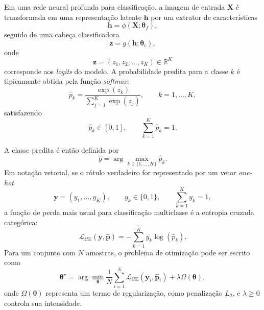 \documentclass[tcc,capa]{texufpel}
\begin{document}
Em uma rede neural profunda para classificação, a imagem de entrada $\mathbf{X}$ é transformada em uma representação latente $\mathbf{h}$ por um extrator de características
\begin{equation}
\mathbf{h} = \phi(\mathbf{X}; \boldsymbol{\theta}_{f}),
\end{equation}
seguido de uma cabeça classificadora
\begin{equation}
\mathbf{z} = g(\mathbf{h}; \boldsymbol{\theta}_{c}),
\end{equation}
onde
\begin{equation}
\mathbf{z} = (z_1,z_2,\dots,z_K) \in \mathbb{R}^{K}
\end{equation}
corresponde aos \textit{logits} do modelo. A probabilidade predita para a classe $k$ é tipicamente obtida pela função \textit{softmax}:
\begin{equation}
\hat{p}_k
=
\frac{\exp(z_k)}
{\sum_{j=1}^{K}\exp(z_j)},
\qquad k=1,\dots,K,
\end{equation}
satisfazendo
\begin{equation}
\hat{p}_k \in [0,1],
\qquad
\sum_{k=1}^{K}\hat{p}_k = 1.
\end{equation}

A classe predita é então definida por
\begin{equation}
\hat{y} = \arg\max_{k \in \{1,\dots,K\}} \hat{p}_k.
\end{equation}
Em notação vetorial, se o rótulo verdadeiro for representado por um vetor \textit{one-hot}
\begin{equation}
\mathbf{y} = (y_1,\dots,y_K),
\qquad
y_k \in \{0,1\},
\qquad
\sum_{k=1}^{K} y_k = 1,
\end{equation}
a função de perda mais usual para classificação multiclasse é a entropia cruzada categórica:
\begin{equation}
\mathcal{L}_{\text{CE}}(\mathbf{y},\hat{\mathbf{p}})
=
-\sum_{k=1}^{K} y_k \log(\hat{p}_k).
\end{equation}
Para um conjunto com $N$ amostras, o problema de otimização pode ser escrito como
\begin{equation}
\boldsymbol{\theta}^{\star}
=
\arg\min_{\boldsymbol{\theta}}
\frac{1}{N}\sum_{i=1}^{N}
\mathcal{L}_{\text{CE}}(\mathbf{y}_i,\hat{\mathbf{p}}_i)
+
\lambda \Omega(\boldsymbol{\theta}),
\end{equation}
onde $\Omega(\boldsymbol{\theta})$ representa um termo de regularização, como penalização $L_2$, e $\lambda \ge 0$ controla sua intensidade.
\end{document}
